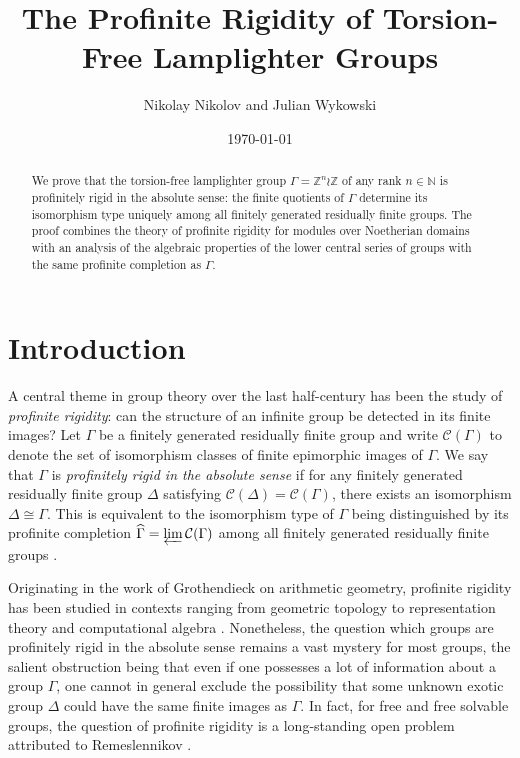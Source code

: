 \documentclass{amsart}
\title{The Profinite Rigidity of Torsion-Free Lamplighter Groups}
\author{Nikolay Nikolov and Julian Wykowski}
\date{\today}
\numberwithin{theorem}{section}
\numberwithin{equation}{section}
\newcommand{\Z}{\mathbb{Z}}
\newcommand{\hG}{\widehat{\Gamma}}
\begin{document}
\begin{abstract}
We prove that the torsion-free lamplighter group $\Gamma = \Z^n \wr \Z$ of any rank $n \in \mathbb{N}$ is profinitely rigid in the absolute sense: the finite quotients of $\Gamma$ determine its isomorphism type uniquely among all finitely generated residually finite groups. The proof combines the theory of profinite rigidity for modules over Noetherian domains with an analysis of the algebraic properties of the lower central series of groups with the same profinite completion as $\Gamma$.
\end{abstract}
\maketitle
\section{Introduction}

A central theme in group theory over the last half-century has been the study of \emph{profinite rigidity}: can the structure of an infinite group be detected in its finite images? Let $\Gamma$ be a finitely generated residually finite group and write $\mathcal{C}(\Gamma)$ to denote the set of isomorphism classes of finite epimorphic images of $\Gamma$. We say that $\Gamma$ is \emph{profinitely rigid in the absolute sense} if for any finitely generated residually finite group $\Delta$ satisfying $\mathcal{C}(\Delta) = \mathcal{C}(\Gamma)$, there exists an isomorphism $\Delta \cong \Gamma$. This is equivalent to the isomorphism type of $\Gamma$ being distinguished by its profinite completion $\hG = \varprojlim{\mathcal{C}(\Gamma)}$ among all finitely generated residually finite groups \cite{Dixon1982}.

Originating in the work of Grothendieck on arithmetic geometry, profinite rigidity has been studied in contexts ranging from geometric topology to representation theory and computational algebra \cite{Grothendieck1970, Bridson2004, Bridson2015, Wilton2019}. Nonetheless, the question which groups are profinitely rigid in the absolute sense remains a vast mystery for most groups, the salient obstruction being that even if one possesses a lot of information about a group $\Gamma$, one cannot in general exclude the possibility that some unknown exotic group $\Delta$ could have the same finite images as $\Gamma$. In fact, for free and free solvable groups, the question of profinite rigidity is a long-standing open problem attributed to Remeslennikov \cite[Question 15]{Noskov1982}.
\end{document}
